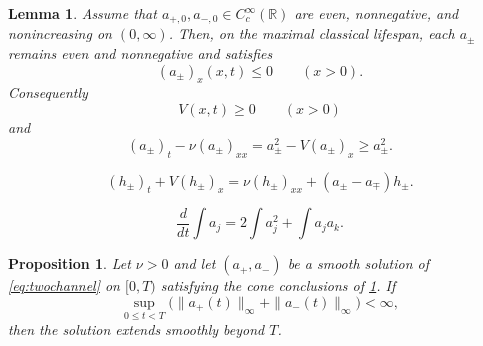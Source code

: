 \documentclass[10pt,a4paper]{amsart}
\newtheorem{lemma}{Lemma}
\newtheorem{proposition}{Proposition}
\newcommand{\R}{\mathbb R}
\begin{document}
\begin{lemma}\label{lem:cone}
Assume that $a_{+,0},a_{-,0}\in C_c^\infty(\R)$ are even, nonnegative, and nonincreasing on $(0,\infty)$.  Then, on the maximal classical lifespan, each $a_\pm$ remains even and nonnegative and satisfies
\begin{equation}\label{eq:monotone}
 (a_\pm)_x(x,t)\le0\qquad(x>0).
\end{equation}
Consequently
\begin{equation}\label{eq:Vsign}
 V(x,t)\ge0\qquad(x>0)
\end{equation}
and
\begin{equation}\label{eq:supersolution}
 (a_\pm)_t-\nu(a_\pm)_{xx}
 =a_\pm^2-V(a_\pm)_x
 \ge a_\pm^2.
\end{equation}
\end{lemma}

\begin{equation}\label{eq:hpm}
 (h_\pm)_t+V(h_\pm)_x
 =\nu(h_\pm)_{xx}+(a_\pm-a_\mp)h_\pm.
\end{equation}

\begin{equation}\label{eq:mass-id}
 \frac{d}{dt}\int a_j
 =2\int a_j^2+\int a_ja_k.
\end{equation}

\begin{proposition}\label{prop:continue}
Let $\nu>0$ and let $(a_+,a_-)$ be a smooth solution of \eqref{eq:twochannel} on $[0,T)$ satisfying the cone conclusions of \cref{lem:cone}.  If
\begin{equation}\label{eq:Astar}
 \sup_{0\le t<T}
 \bigl(\|a_+(t)\|_\infty+\|a_-(t)\|_\infty\bigr)<\infty,
\end{equation}
then the solution extends smoothly beyond $T$.
\end{proposition}
\end{document}

